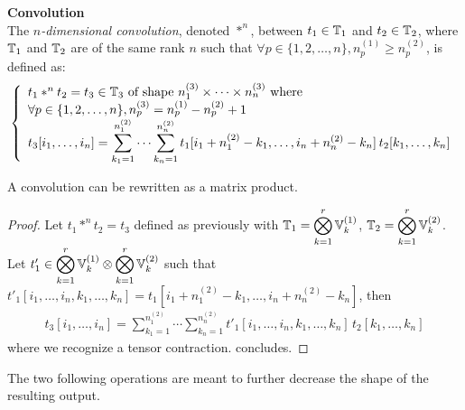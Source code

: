 \begin{definition}\textbf{Convolution}\\
The \emph{$n$-dimensional convolution}, denoted $\ast^n$, between $t_1 \in \mathbb{T}_1$ and $t_2 \in \mathbb{T}_2$, where $\mathbb{T}_1$ and $\mathbb{T}_2$ are of the same rank $n$ such that $\forall p \in \{1, 2, \ldots, n\}, n_p^{(1)} \ge n_p^{(2)}$, is defined as:
\begin{gather*}
\left\{
  \begin{array}{l}
    t_1 \ast^n t_2 = t_3 \in  \mathbb{T}_3 \text{ of shape } n_1^{(3)} \times \cdots \times n_n^{(3)}
    \text{ where} \\
    \forall p \in \{1, 2, \ldots, n\}, n_p^{(3)} = n_p^{(1)} - n_p^{(2)} + 1 \\
    t_3[i_1, \ldots, i_n] =
    \displaystyle \sum_{k_1=1}^{n_1^{(2)}} \cdots \sum_{k_n=1}^{n_n^{(2)}}
    t_1[i_1 + n_1^{(2)} - k_1, \ldots, i_n + n_n^{(2)} - k_n] \hspace{2pt} t_2[k_1, \ldots, k_n] \\
  \end{array}
\right.
\end{gather*}
\label{def:convdef}
\end{definition}

\begin{proposition}%
A convolution can be rewritten as a matrix product.
\label{prop:matprodeq2}
\end{proposition}

\begin{proof}
Let $t_1 \ast^n t_2 = t_3$ defined as previously with $\mathbb{T}_1 = \displaystyle \bigotimes_{k=1}^r \mathbb{V}_k^{(1)}$, $\mathbb{T}_2 = \displaystyle \bigotimes_{k=1}^r \mathbb{V}_k^{(2)}$. Let $t'_1 \in \displaystyle \bigotimes_{k=1}^r \mathbb{V}_k^{(1)} \otimes \displaystyle \bigotimes_{k=1}^r \mathbb{V}_k^{(2)}$ such that $t'_1[i_1, \ldots, i_n, k_1, \ldots, k_n] = t_1[i_1 + n_1^{(2)} - k_1, \ldots, i_n + n_n^{(2)} - k_n]$, then
\begin{gather*}
t_3[i_1, \ldots, i_n] =
    \displaystyle \sum_{k_1=1}^{n_1^{(2)}} \cdots \sum_{k_n=1}^{n_n^{(2)}}
    t'_1[i_1, \ldots, i_n, k_1, \ldots, k_n] \hspace{2pt} t_2[k_1, \ldots, k_n]
\end{gather*}
where we recognize a tensor contraction.  concludes.
\end{proof}

The two following operations are meant to further decrease the shape of the resulting output.


